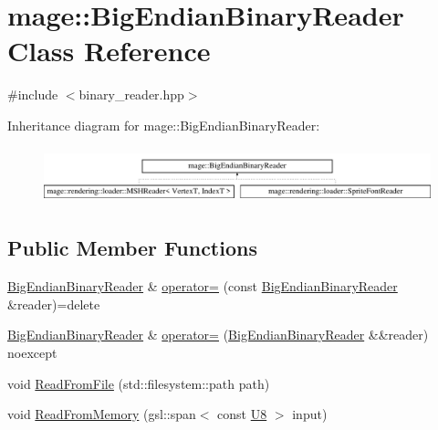 \hypertarget{classmage_1_1_big_endian_binary_reader}{}\section{mage\+:\+:Big\+Endian\+Binary\+Reader Class Reference}
\label{classmage_1_1_big_endian_binary_reader}


{\ttfamily \#include $<$binary\+\_\+reader.\+hpp$>$}

Inheritance diagram for mage\+:\+:Big\+Endian\+Binary\+Reader\+:\begin{figure}[H]
\begin{center}
\leavevmode
\includegraphics[height=1.637427cm]{classmage_1_1_big_endian_binary_reader}
\end{center}
\end{figure}
\subsection*{Public Member Functions}
\begin{DoxyCompactItemize}
\item 
\mbox{\hyperlink{classmage_1_1_big_endian_binary_reader}{Big\+Endian\+Binary\+Reader}} \& \mbox{\hyperlink{classmage_1_1_big_endian_binary_reader_abd4b24df4219469a8c2e9253b1cad405}{operator=}} (const \mbox{\hyperlink{classmage_1_1_big_endian_binary_reader}{Big\+Endian\+Binary\+Reader}} \&reader)=delete
\item 
\mbox{\hyperlink{classmage_1_1_big_endian_binary_reader}{Big\+Endian\+Binary\+Reader}} \& \mbox{\hyperlink{classmage_1_1_big_endian_binary_reader_ac37539cb08ea9278daf5628a0c5895d8}{operator=}} (\mbox{\hyperlink{classmage_1_1_big_endian_binary_reader}{Big\+Endian\+Binary\+Reader}} \&\&reader) noexcept
\item 
void \mbox{\hyperlink{classmage_1_1_big_endian_binary_reader_a0308b90e3cf888d383a228cfe8827972}{Read\+From\+File}} (std\+::filesystem\+::path path)
\item 
void \mbox{\hyperlink{classmage_1_1_big_endian_binary_reader_afc48490dca5042078726a1ec3fe7abe7}{Read\+From\+Memory}} (gsl\+::span$<$ const \mbox{\hyperlink{namespacemage_a30677c03d683c4c35630c25f6ff3fb7f}{U8}} $>$ input)
\end{DoxyCompactItemize}
